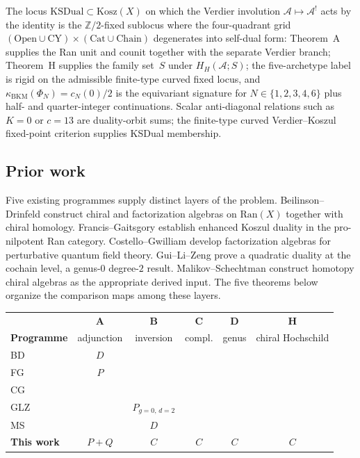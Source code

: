 \documentclass[11pt]{article}
\theoremstyle{plain}
\theoremstyle{definition}
\theoremstyle{remark}
\newcommand{\Ran}{\mathrm{Ran}}
\newcommand{\cA}{\mathcal{A}}
\begin{document}
The locus $\mathrm{KSDual} \subset \mathrm{Kosz}(X)$ on which
the Verdier involution $\cA \mapsto \cA^!$ acts by the identity
is the $\mathbb{Z}/2$-fixed sublocus where the four-quadrant
grid $(\text{Open} \cup \text{CY}) \times
(\text{Cat} \cup \text{Chain})$ degenerates into self-dual
form: Theorem~A supplies the Ran unit and counit together with the
separate Verdier branch; Theorem~H supplies the family set~$S$ under
$H_H(\cA;S)$; the
five-archetype label is rigid on the admissible finite-type
curved fixed locus, and
$\kappa_{\mathrm{BKM}}(\Phi_N) = c_N(0)/2$
\cite{Borcherds1998,Gritsenko1999} is the equivariant
signature for $N \in \{1, 2, 3, 4, 6\}$ plus half- and
quarter-integer continuations. Scalar anti-diagonal relations such as
$K=0$ or $c=13$ are duality-orbit sums; the finite-type curved
Verdier--Koszul fixed-point criterion supplies KSDual membership.

\subsection{Prior work}

Five existing programmes supply distinct layers of the problem.
Beilinson--Drinfeld \cite{BD04} construct chiral and factorization
algebras on $\Ran(X)$ together with chiral homology.
Francis--Gaitsgory \cite{FG12} establish enhanced Koszul duality in
the pro-nilpotent Ran category.
Costello--Gwilliam \cite{CG17} develop factorization algebras for
perturbative quantum field theory.
Gui--Li--Zeng \cite{GLZ24} prove a quadratic duality at the
cochain level, a genus-$0$ degree-$2$ result.
Malikov--Schechtman \cite{MS24} construct homotopy chiral algebras
as the appropriate derived input.  The five theorems below organize
the comparison maps among these layers.

\begin{center}
\small
\begin{tabular}{l@{\quad}c@{\quad}c@{\quad}c@{\quad}c@{\quad}c}
\toprule
& \textbf{A} & \textbf{B} & \textbf{C} & \textbf{D} & \textbf{H} \\
\textbf{Programme}
& \footnotesize adjunction
& \footnotesize inversion
& \footnotesize compl.
& \footnotesize genus
& \footnotesize chiral Hochschild \\
\midrule
BD \cite{BD04}
 & $D$ & & & & \\
FG \cite{FG12}
 & $P$ & & & & \\
CG \cite{CG17}
 & & & & & \\
GLZ \cite{GLZ24}
 & & $P_{g=0,\,d=2}$ & & & \\
MS \cite{MS24}
 & & $D$ & & & \\
\textbf{This work}
 & $P+Q$ & $C$ & $C$ & $C$ & $C$ \\
\bottomrule
\end{tabular}
\end{center}
\end{document}
